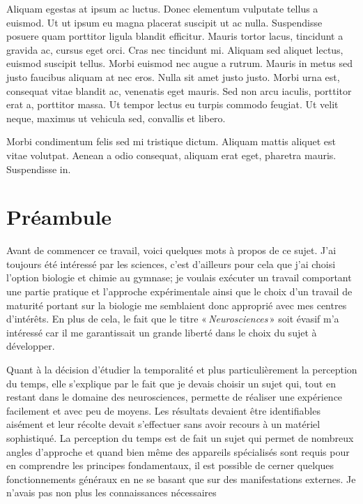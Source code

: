 \documentclass[12pt,fleqn,oneside,openany]{book} %
\begin{document}
Aliquam egestas at ipsum ac luctus. Donec elementum vulputate tellus a euismod. Ut ut ipsum eu magna placerat suscipit ut ac nulla. Suspendisse posuere quam porttitor ligula blandit efficitur. Mauris tortor lacus, tincidunt a gravida ac, cursus eget orci. Cras nec tincidunt mi. Aliquam sed aliquet lectus, euismod suscipit tellus. Morbi euismod nec augue a rutrum. Mauris in metus sed justo faucibus aliquam at nec eros. Nulla sit amet justo justo. Morbi urna est, consequat vitae blandit ac, venenatis eget mauris. Sed non arcu iaculis, porttitor erat a, porttitor massa. Ut tempor lectus eu turpis commodo feugiat. Ut velit neque, maximus ut vehicula sed, convallis et libero.

Morbi condimentum felis sed mi tristique dictum. Aliquam mattis aliquet est vitae volutpat. Aenean a odio consequat, aliquam erat eget, pharetra mauris. Suspendisse in. 

\section{Préambule}
Avant de commencer ce travail, voici quelques mots à propos de ce sujet. J'ai toujours été intéressé par les sciences, c'est d'ailleurs pour cela que j'ai choisi l'option biologie et chimie au gymnase; je voulais exécuter un travail comportant une partie pratique et l'approche expérimentale ainsi que le choix d'un travail de maturité portant sur la biologie me semblaient donc approprié avec mes centres d'intérêts. En plus de cela, le fait que le titre «\,\emph{Neurosciences}\,» soit évasif m'a intéressé car il me garantissait un grande liberté dans le choix du sujet à développer.

Quant à la décision d'étudier la temporalité et plus particulièrement la perception du temps, elle s'explique par le fait que je devais choisir un sujet qui, tout en restant dans le domaine des neurosciences, permette de réaliser une expérience facilement et avec peu de moyens. Les résultats devaient être identifiables aisément et leur récolte devait s'effectuer sans avoir recours à un matériel sophistiqué. La perception du temps est de fait un sujet qui permet de nombreux angles d'approche et quand bien même des appareils spécialisés sont requis pour en comprendre les principes fondamentaux, il est possible de cerner quelques fonctionnements généraux en ne se basant que sur des manifestations externes. Je n'avais pas non plus les connaissances nécessaires 
\end{document}
